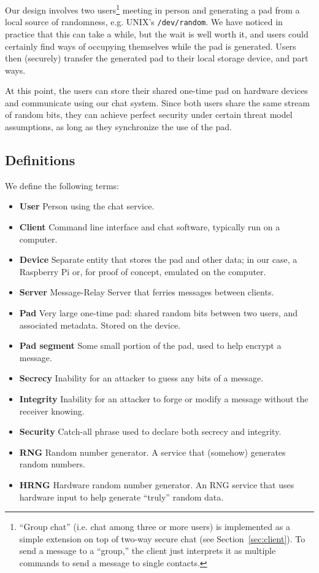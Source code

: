 \documentclass[twocolumn]{article}
\begin{document}
Our design involves two users\footnote{
``Group chat'' (i.e. chat among three or more users) is implemented as a simple extension on top of two-way secure chat (see Section~\ref{sec:client}). To send a message to a ``group,'' the client just interprets it as multiple commands to send a message to single contacts.
}
meeting in person and generating a pad from a local source of randomness, e.g. UNIX's \texttt{/dev/random}. We have noticed in practice that this can take a while, but the wait is well worth it, and users could certainly find ways of occupying themselves while the pad is generated. Users then (securely) transfer the generated pad to their local storage device, and part ways.

At this point, the users can store their shared one-time pad on hardware devices and communicate using our chat system. Since both users share the same stream of random bits, they can achieve perfect security under certain threat model assumptions, as long as they synchronize the use of the pad.

\subsection{Definitions}
We define the following terms:
\begin{itemize} \itemsep0em 
  \item \textbf{User} Person using the chat service.
  \item \textbf{Client} Command line interface and chat software, typically run on a computer.
  \item \textbf{Device} Separate entity that stores the pad and other data; in our case, a Raspberry Pi or, for proof of concept, emulated on the computer.
  \item \textbf{Server} Message-Relay Server that ferries messages between clients.
  \item \textbf{Pad} Very large one-time pad: shared random bits between two users, and associated metadata. Stored on the device.
  \item \textbf{Pad segment} Some small portion of the pad, used to help encrypt a message.
  \item \textbf{Secrecy} Inability for an attacker to guess any bits of a message.
  \item \textbf{Integrity} Inability for an attacker to forge or modify a message without the receiver knowing.
  \item \textbf{Security} Catch-all phrase used to declare both secrecy and integrity.
  \item \textbf{RNG} Random number generator. A service that (somehow) generates random numbers.
  \item \textbf{HRNG} Hardware random number generator. An RNG service that uses hardware input to help generate ``truly'' random data.
\end{itemize}
\end{document}
